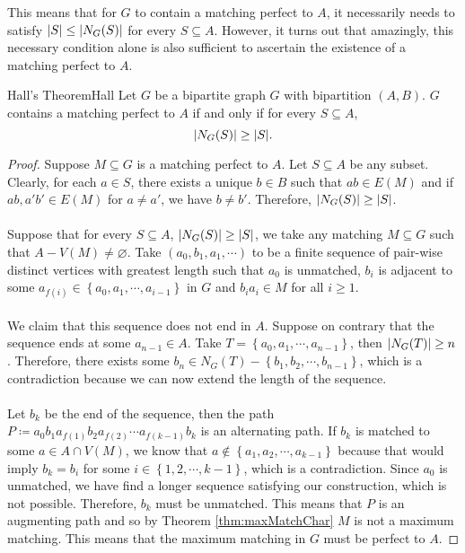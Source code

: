 \documentclass[math, code]{amznotes}
\theoremstyle{remark}
\begin{document}
This means that for $G$ to contain a matching perfect to $A$, it necessarily needs to satisfy ${\left\lvert {S} \right\rvert} \leq {\left\lvert {N_G(S)} \right\rvert}$ for every $S \subseteq A$. However, it turns out that amazingly, this necessary condition alone is also sufficient to ascertain the existence of a matching perfect to $A$.
\begin{thmbox}{Hall's Theorem}{Hall}
    Let $G$ be a bipartite graph $G$ with bipartition $(A, B)$. $G$ contains a matching perfect to $A$ if and only if for every $S \subseteq A$,
    \begin{equation*}
        {\left\lvert {N_G(S)} \right\rvert} \geq {\left\lvert {S} \right\rvert}.
    \end{equation*}
    \tcblower
    \begin{proof}
        Suppose $M \subseteq G$ is a matching perfect to $A$. Let $S \subseteq A$ be any subset. Clearly, for each $a \in S$, there exists a unique $b \in B$ such that $ab \in E(M)$ and if $ab, a'b' \in E(M)$ for $a \neq a'$, we have $b \neq b'$. Therefore, ${\left\lvert {N_G(S)} \right\rvert} \geq {\left\lvert {S} \right\rvert}$.
        \\\\
        Suppose that for every $S \subseteq A$, ${\left\lvert {N_G(S)} \right\rvert} \geq {\left\lvert {S} \right\rvert}$, we take any matching $M \subseteq G$ such that $A - V(M) \neq \varnothing$. Take $(a_0, b_1, a_1, \cdots)$ to be a finite sequence of pair-wise distinct vertices with greatest length such that $a_0$ is unmatched, $b_i$ is adjacent to some $a_{f(i)} \in \left\{a_0, a_1, \cdots, a_{i - 1}\right\}$ in $G$ and $b_ia_i \in M$ for all $i \geq 1$.
        \\\\
        We claim that this sequence does not end in $A$. Suppose on contrary that the sequence ends at some $a_{n - 1} \in A$. Take $T = \left\{a_0, a_1, \cdots, a_{n - 1}\right\}$, then ${\left\lvert {N_G(T)} \right\rvert} \geq n$. Therefore, there exists some $b_n \in N_G(T) - \left\{b_1, b_2, \cdots, b_{n - 1}\right\}$, which is a contradiction because we can now extend the length of the sequence. 
        \\\\
        Let $b_k$ be the end of the sequence, then the path $P \coloneqq a_0b_1a_{f(1)}b_2a_{f(2)}\cdots a_{f(k - 1)}b_k$ is an alternating path. If $b_k$ is matched to some $a \in A \cap V(M)$, we know that $a \notin \left\{a_1, a_2,\cdots, a_{k - 1}\right\}$ because that would imply $b_k = b_i$ for some $i \in \left\{1, 2, \cdots, k - 1\right\}$, which is a contradiction. Since $a_0$ is unmatched, we have find a longer sequence satisfying our construction, which is not possible. Therefore, $b_k$ must be unmatched. This means that $P$ is an augmenting path and so by Theorem \ref{thm:maxMatchChar} $M$ is not a maximum matching. This means that the maximum matching in $G$ must be perfect to $A$.
    \end{proof}
\end{thmbox}
\end{document}
